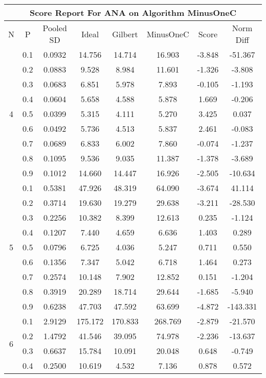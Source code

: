 \documentclass[11pt,a4paper]{report}
\begin{document}
\begin{longtable}{ | c | c || c | c | c | c | c | c | }
\hline
\multicolumn{8}{|c|}{ Score Report For ANA on Algorithm MinusOneC} \\
\hline
N & P & Pooled SD &  Ideal &  Gilbert & MinusOneC  & Score & Norm Diff \\
 \hline
 \hline
 \endhead
\multirow{9}{*}{4} & 0.1 & 0.0932 & 14.756 & 14.714 & 16.903 & -3.848 & -51.367 \\
 & 0.2 & 0.0883 & 9.528 & 8.984 & 11.601 & -1.326 & -3.808 \\
 & 0.3 & 0.0683 & 6.851 & 5.978 & 7.893 & -0.105 & -1.193 \\
 & 0.4 & 0.0604 & 5.658 & 4.588 & 5.878 & 1.669 & -0.206 \\
 & 0.5 & 0.0399 & 5.315 & 4.111 & 5.270 & 3.425 & 0.037 \\
 & 0.6 & 0.0492 & 5.736 & 4.513 & 5.837 & 2.461 & -0.083 \\
 & 0.7 & 0.0689 & 6.833 & 6.002 & 7.860 & -0.074 & -1.237 \\
 & 0.8 & 0.1095 & 9.536 & 9.035 & 11.387 & -1.378 & -3.689 \\
 & 0.9 & 0.1012 & 14.660 & 14.447 & 16.926 & -2.505 & -10.634 \\
 \hline
\multirow{9}{*}{5} & 0.1 & 0.5381 & 47.926 & 48.319 & 64.090 & -3.674 & 41.114 \\
 & 0.2 & 0.3714 & 19.630 & 19.279 & 29.638 & -3.211 & -28.530 \\
 & 0.3 & 0.2256 & 10.382 & 8.399 & 12.613 & 0.235 & -1.124 \\
 & 0.4 & 0.1207 & 7.440 & 4.659 & 6.636 & 1.403 & 0.289 \\
 & 0.5 & 0.0796 & 6.725 & 4.036 & 5.247 & 0.711 & 0.550 \\
 & 0.6 & 0.1356 & 7.347 & 5.042 & 6.718 & 1.464 & 0.273 \\
 & 0.7 & 0.2574 & 10.148 & 7.902 & 12.852 & 0.151 & -1.204 \\
 & 0.8 & 0.3919 & 20.289 & 18.714 & 29.644 & -1.685 & -5.940 \\
 & 0.9 & 0.6238 & 47.703 & 47.592 & 63.699 & -4.872 & -143.331 \\
 \hline
\multirow{9}{*}{6} & 0.1 & 2.9129 & 175.172 & 170.833 & 268.769 & -2.879 & -21.570 \\
 & 0.2 & 1.4792 & 41.546 & 39.095 & 74.978 & -2.236 & -13.637 \\
 & 0.3 & 0.6637 & 15.784 & 10.091 & 20.048 & 0.648 & -0.749 \\
 & 0.4 & 0.2500 & 10.619 & 4.532 & 7.136 & 0.878 & 0.572 \\

\end{longtable}
\end{document}
